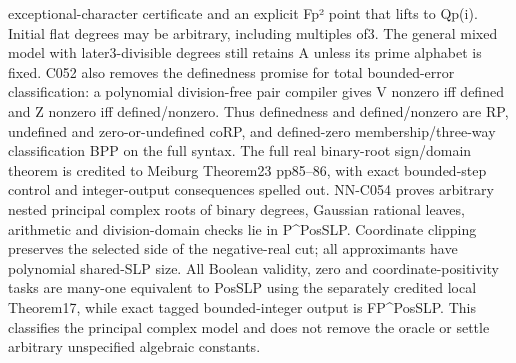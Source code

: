exceptional-character certificate and an explicit Fp² point that lifts to Qp(i). Initial flat degrees may be arbitrary, including multiples of3. The general mixed model with later3-divisible degrees still retains A unless its prime alphabet is fixed. C052 also removes the definedness promise for total bounded-error classification: a polynomial division-free pair compiler gives V nonzero iff defined and Z nonzero iff defined/nonzero. Thus definedness and defined/nonzero are RP, undefined and zero-or-undefined coRP, and defined-zero membership/three-way classification BPP on the full syntax. The full real binary-root sign/domain theorem is credited to Meiburg Theorem23 pp85--86, with exact bounded-step control and integer-output consequences spelled out. NN-C054 proves arbitrary nested principal complex roots of binary degrees, Gaussian rational leaves, arithmetic and division-domain checks lie in P\textasciicircum{}PosSLP. Coordinate clipping preserves the selected side of the negative-real cut; all approximants have polynomial shared-SLP size. All Boolean validity, zero and coordinate-positivity tasks are many-one equivalent to PosSLP using the separately credited local Theorem17, while exact tagged bounded-integer output is FP\textasciicircum{}PosSLP. This classifies the principal complex model and does not remove the oracle or settle arbitrary unspecified algebraic constants.
